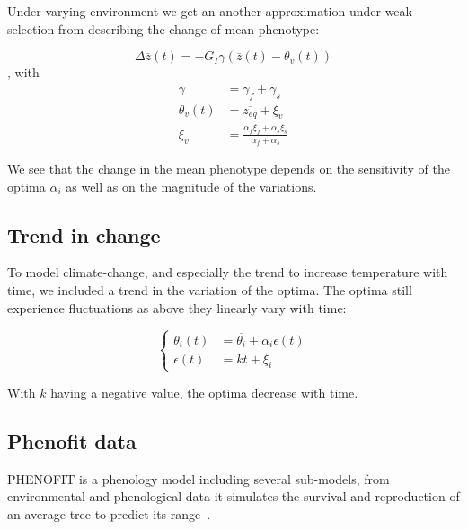 Under varying environment we get an another approximation under weak selection from \citep{engen_evolution_2011} describing the change of mean phenotype:

\begin{equation}
	\label{eq:zfluct}
	\Delta \overline{z}(t) = - G_I \gamma (\overline{z}(t) - \theta_v(t))
\end{equation}
, with
\begin{subequations}
	\begin{align}
		\gamma &= \gamma_f + \gamma_s \\
		\theta_v(t) &= \overline{z_{eq}} + \xi_v \\
		\xi_v &= \frac{\alpha_f \xi_f + \alpha_s \xi_s}{\alpha_f + \alpha_s}
	\end{align}
\end{subequations}

We see that the change in the mean phenotype depends on the sensitivity of the optima $\alpha_i$ as well as on the magnitude of the variations.

\subsection*{Trend in change}

To model climate-change, and especially the trend to increase temperature with time, we included a trend in the variation of the optima. The optima still experience fluctuations as above they linearly vary with time:

\begin{equation}
	\label{eq:kt}
	\left\{
	\begin{aligned}
		\theta_i(t) &= \overline{\theta_i} + \alpha_i\epsilon(t) \\
		\epsilon(t) &= kt + \xi_i
	\end{aligned}
	\right.
\end{equation}

With $k$ having a negative value, the optima decrease with time.

\subsection*{Phenofit data}

\textsc{PHENOFIT} is a phenology model including several sub-models, from environmental and phenological data it simulates the survival and reproduction of an average tree to predict its range~\citep{morin_tree_2008}.

